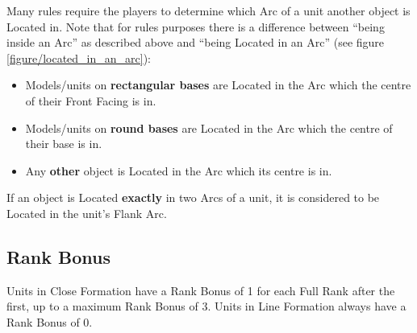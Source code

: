 Many rules require the players to determine which Arc of a unit another object is Located in. Note that for rules purposes there is a difference between \enquote{being inside an Arc} as described above and \enquote{being Located in an Arc} (see figure \ref{figure/located_in_an_arc}):

\begin{itemize}
\item Models/units on \textbf{rectangular bases} are Located in the Arc which the centre of their Front Facing is in.
\item Models/units on \textbf{round bases} are Located in the Arc which the centre of their base is in.
\item Any \textbf{other} object is Located in the Arc which its centre is in.
\end{itemize}

If an object is Located \textbf{exactly} in two Arcs of a unit, it is considered to be Located in the unit's Flank Arc.

\subsection{Rank Bonus}
\label{rank_bonus}
Units in Close Formation have a Rank Bonus of 1 for each Full Rank after the first, up to a maximum Rank Bonus of 3. Units in Line Formation always have a Rank Bonus of 0.


\newcommand{\ARCSa}{a)}
\newcommand{\ARCSb}{b)}
\newcommand{\ARCSc}{c)}

\newcommand{\frontarc}{\normalfontsize{}Front Arc}
\newcommand{\leftflankarc}{%
\begin{minipage}{0.06\unitlength}\begin{center}%
\normalfontsize{}Left Flank Arc%
\end{center}\end{minipage}}
\newcommand{\rightflankarc}{%
\begin{minipage}{0.06\unitlength}\begin{center}%
\normalfontsize{}Right Flank Arc%
\end{center}\end{minipage}}
\newcommand{\reararc}{\normalfontsize{}Rear Arc}
\newcommand{\firstangle}{\normalfontsize{}\SI{90}{\degree}}
\newcommand{\secondangle}{\normalfontsize{}\SI{135}{\degree}}

\newcommand{\frontfacing}{\normalfontsize{}Front Facing}
\newcommand{\leftflankfacing}{%
\begin{minipage}{0.06\unitlength}\begin{center}%
\normalfontsize{}Left Flank Facing%
\end{center}\end{minipage}}
\newcommand{\rightflankfacing}{%
\begin{minipage}{0.06\unitlength}\begin{center}%
\normalfontsize{}Right Flank Facing%
\end{center}\end{minipage}}
\newcommand{\rearfacing}{\normalfontsize{}Rear Facing}
\newcommand{\centreofunit}{\normalfontsize{}Centre of Unit}

